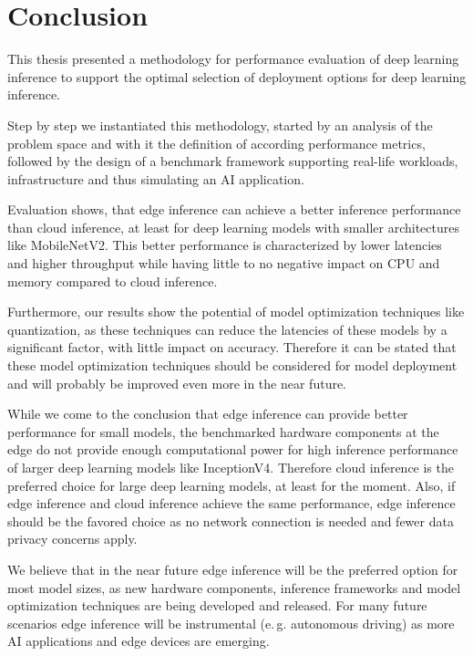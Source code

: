 \chapter{Conclusion}
\label{chap:conclusion}

This thesis presented a methodology for performance evaluation of deep learning inference to support the optimal selection of deployment options for deep learning inference.

Step by step we instantiated this methodology, started by an analysis of the problem space and with it the definition of according performance metrics, followed by the design of a benchmark framework supporting real-life workloads, infrastructure and thus simulating an AI application.

Evaluation shows, that edge inference can achieve a better inference performance than cloud inference, at least for deep learning models with smaller architectures like MobileNetV2.
This better performance is characterized by lower latencies and higher throughput while having little to no negative impact on CPU and memory compared to cloud inference.

Furthermore, our results show the potential of model optimization techniques like quantization, as these techniques can reduce the latencies of these models by a significant factor, with little impact on accuracy.
Therefore it can be stated that these model optimization techniques should be considered for model deployment and will probably be improved even more in the near future.

While we come to the conclusion that edge inference can provide better performance for small models, the benchmarked hardware components at the edge do not provide enough computational power for high inference performance of larger deep learning models like InceptionV4.
Therefore cloud inference is the preferred choice for large deep learning models, at least for the moment.
Also, if edge inference and cloud inference achieve the same performance, edge inference should be the favored choice as no network connection is needed and fewer data privacy concerns apply.

We believe that in the near future edge inference will be the preferred option for most model sizes, as new hardware components, inference frameworks and model optimization techniques are being developed and released.
For many future scenarios edge inference will be instrumental (e.\,g. autonomous driving) as more AI applications and edge devices are emerging.


